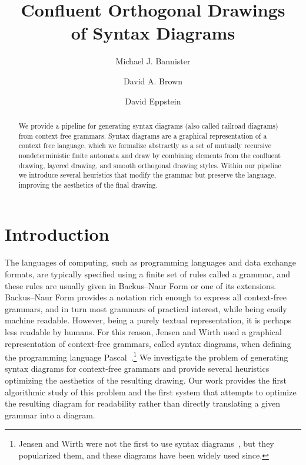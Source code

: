 \documentclass[10pt]{llncs}
\title{Confluent Orthogonal Drawings\\of Syntax Diagrams}
\author{Michael J. Bannister
\and David A. Brown
\and David Eppstein
}
\institute{Department of Computer Science, University of California, Irvine\thanks{Michael Bannister and David Eppstein were supported in part by NSF grant  CCF-1228639.}}
\begin{document}
\maketitle

\begin{abstract}
We provide a pipeline for generating syntax diagrams (also called railroad diagrams) from context free grammars. Syntax diagrams are a graphical representation of a context free language, which we formalize abstractly as a set of mutually recursive nondeterministic finite automata and draw by combining elements from the confluent drawing, layered drawing, and smooth orthogonal drawing styles. Within our pipeline we introduce several heuristics that modify the grammar but preserve the language, improving  the aesthetics of the final drawing.
\end{abstract}

\section{Introduction}
The languages of computing, such as programming languages and data exchange formats, are typically specified using a finite set of rules called a grammar, and these rules are usually given in Backus--Naur Form or one of its extensions. Backus--Naur Form provides a notation rich enough to express all context-free grammars, and in turn most grammars of practical interest, while being easily machine readable. However, being a purely textual representation, it is perhaps less  readable by humans. For this reason, Jensen and Wirth used a graphical representation of context-free grammars, called syntax diagrams, when defining the programming language Pascal~\cite{pascal-book}.\footnote{Jensen and Wirth were not the first to use syntax diagrams~\cite{cande-book}, but they popularized them, and these diagrams have been widely used since.} We investigate the problem of generating syntax diagrams for context-free grammars and provide several heuristics optimizing the aesthetics of the resulting drawing. Our work provides the first algorithmic study of this problem and the first system that attempts to optimize the resulting diagram for readability rather than directly translating a given grammar into a diagram.
\end{document}
